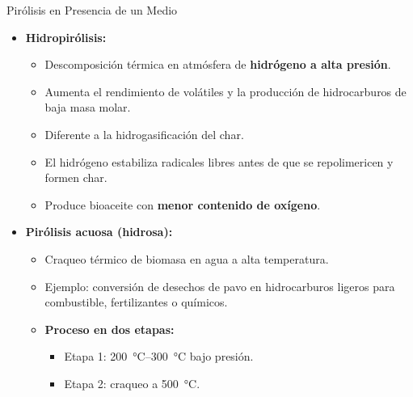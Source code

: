 \documentclass[../../main.tex]{subfiles}
\begin{document}
\begin{frame}{Pirólisis en Presencia de un Medio}
\footnotesize
\begin{itemize}
  \item \textbf{Hidropirólisis:}
  \begin{itemize}
    \item Descomposición térmica en atmósfera de \textbf{hidrógeno a alta presión}.
    \item Aumenta el rendimiento de volátiles y la producción de hidrocarburos de baja masa molar.
    \item Diferente a la hidrogasificación del char.
    \item El hidrógeno estabiliza radicales libres antes de que se repolimericen y formen char.
    \item Produce bioaceite con \textbf{menor contenido de oxígeno}.
  \end{itemize}

  \item \textbf{Pirólisis acuosa (hidrosa):}
  \begin{itemize}
    \item Craqueo térmico de biomasa en agua a alta temperatura.
    \item Ejemplo: conversión de desechos de pavo en hidrocarburos ligeros para combustible, fertilizantes o químicos.
    \item \textbf{Proceso en dos etapas:}
    \begin{itemize}
      \item Etapa 1: \SI{200}{\degreeCelsius}–\SI{300}{\degreeCelsius} bajo presión.
      \item Etapa 2: craqueo a \SI{500}{\degreeCelsius}.
    \end{itemize}
  \end{itemize}
\end{itemize}
\end{frame}
\end{document}
